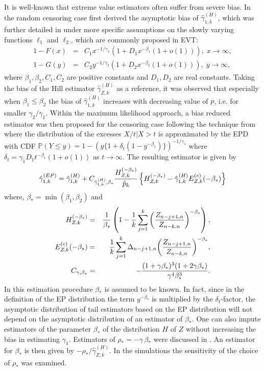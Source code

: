\vspace{0.3cm}
It is well-known that extreme value estimators often suffer from severe bias. In the random censoring case \cite{einmahl2008statistics} first derived the asymptotic bias of $\hat{\gamma}_{1,k}^{(H)}$, which was further detailed in \cite{beirlant2016bias} under more specific assumptions on the slowly varying functions $\ell_1 $ and $\ell_2$, which are commonly proposed in EVT:
\begin{eqnarray*}
1-F(x)&=&C_1 {x^{-1/\gamma_1}}(1+D_{1} x^{-\beta_1} (1+o(1))),\; x \to \infty,\\
1-G(y)&=&C_2 {y^{-1/\gamma_2}}(1+D_{2} x^{-\beta_2} (1+o(1))),\; y \to \infty,
\end{eqnarray*}
where $\beta_1,\beta_2,C_1,C_2$ are positive constants and $D_1,D_2$ are real constants. Taking the bias of the Hill estimator $\hat{\gamma}^{(H)}_{Z,k}$ as a reference, it was observed that especially when $\beta_1 \leq \beta_2$ the bias of $\hat{\gamma}_{1,k}^{(H)}$ increases with decreasing value of $p$, i.e. for smaller $\gamma_2/\gamma_1$.
Within the maximum likelihood approach, a bias reduced estimator was then proposed for the censoring case following the technique from \cite{beirlant2009second} where the distribution of the excesses $X/t|X>t$ is approximated by the EPD with CDF
$\mathbb{P}(Y \leq y)=1-(y\{1+\delta_t (1-y^{-\beta_1})\})^{-1/\gamma_1}$ where $\delta_t = \gamma_1 D_1 t^{-\beta_1} (1+o(1))$ as $t \to \infty$. The resulting estimator is given by
\begin{equation}
\hat{\gamma}_{1,k}^{(EP)}
=\hat{\gamma}_{1,k}^{(H)}+C_{\hat{\gamma}_{1,k}^{(H)},\beta_*}{H_{Z,k}^{(-\beta_*)}\over \hat{p}_k}
\left\{
H_{Z,k}^{(-\beta_*)}-\hat{\gamma}_{1,k}^{(H)}E_{Z,k}^{(c)}(-\beta_*)
\right\}
\label{biasreduced}
\end{equation}
where, $\beta_{*}=\min(\beta_1,\beta_2)$ and  
\begin{eqnarray*}
H_{Z,k}^{(-\beta_*)}&=&{1\over\beta_*}
\left(1-{1\over{k}}\sum_{j=1}^k \left({Z_{n-j+1,n}\over Z_{n-k,n}}\right)^{-\beta_*}\right), \\
E_{Z,k}^{(c)}(-\beta_*)&=&{1\over{k}}\sum_{j=1}^k \Delta_{n-j+1,n}{\left(Z_{n-j+1,n}\over{Z_{n-k,n}}\right)}^{-\beta_*},\\ C_{\gamma,\beta_*}&=&-{{(1+\gamma\beta_*)^3(1+2\gamma\beta_*)}\over{\gamma^4\beta_*^3}}.
\end{eqnarray*}
In this estimation procedure $\beta_*$ is assumed to be known. In fact, since in the definition of the EP distribution the term $y^{-\beta_*}$ is multiplied by the $\delta_t$-factor, the asymptotic distribution of tail estimators based on the EP distribution will not depend on the asymptotic distribution of an estimator of $\beta_*$. One can also impute estimators of the parameter $\beta_*$ of the distribution $H$ of $Z$ without increasing the bias in estimating $\gamma_1$. Estimators of $\rho_* = -\gamma \, \beta_*$ were discussed in \cite{alves2003new}. An estimator for $\beta_*$ is then given by $-\rho_*/ \hat{\gamma}_{Z,k}^{(H)}$. In the simulations the sensitivity of the choice of $\rho_*$ was examined.
